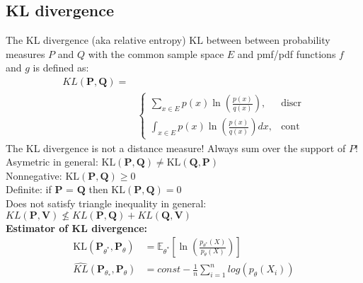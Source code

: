 \subsection{KL divergence}
The KL divergence (aka relative entropy) $\text {KL}$ between between probability measures $P$ and $Q$ with the common sample space $E$ and pmf/pdf functions $f$ and $g$ is defined as:
\begin{align*}
  {KL}(\mathbf{P}, \mathbf{Q}) = &\\
	&\begin{cases}
		  \sum _{x \in E} p(x) \ln \left( \frac{p(x)}{q(x)} \right),&\text{discr}\\	 
		{\int }_{x \in E} p(x) \ln \left( \frac{p(x)}{q(x)}\right)dx,&\text{cont}
	\end{cases}
\end{align*}
The KL divergence is not a distance measure! Always sum over the support of $P$!\\
Asymetric in general: $\text {KL}(\mathbf{P}, \mathbf{Q}) \neq \text {KL}(\mathbf{Q}, \mathbf{P})$\\
Nonnegative: $\text {KL}(\mathbf{P}, \mathbf{Q}) \geq 0$\\
Definite: if $\mathbf{P}$ = $\mathbf{Q}$ then $\text {KL}(\mathbf{P}, \mathbf{Q}) = 0$\\
Does not satisfy triangle inequality in general: $KL(\mathbf{P}, \mathbf{V}) \nleq KL(\mathbf{P}, \mathbf{Q}) + KL(\mathbf{Q}, \mathbf{V})$\\

\textbf{Estimator of KL divergence:}
\begin{align*}
\displaystyle  \text {KL}\left(\mathbf{P}_{\theta ^*}, \mathbf{P}_{\theta }\right)& = \mathbb {E}_{\theta ^*}\left[\ln \left(\frac{p_{\theta ^*}(X)}{p_{\theta }(X)}\right)\right]\\
\widehat{KL}(\mathbf{P}_{\theta_{*}},\mathbf{P}_{\theta})& = const - \frac{1}{n} \sum_{i=1}^{n} log(p_{\theta}(X_i))
\end{align*}